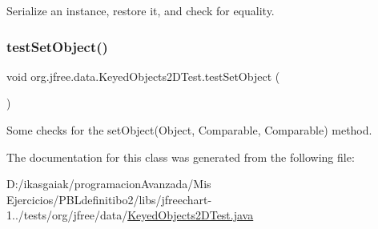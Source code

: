 Serialize an instance, restore it, and check for equality. \mbox{\label{classorg_1_1jfree_1_1data_1_1_keyed_objects2_d_test_abf42be762da76e5c3773c06e4d5bc339}} 
\subsubsection{\texorpdfstring{test\+Set\+Object()}{testSetObject()}}
{\footnotesize\ttfamily void org.\+jfree.\+data.\+Keyed\+Objects2\+D\+Test.\+test\+Set\+Object (\begin{DoxyParamCaption}{ }\end{DoxyParamCaption})}

Some checks for the set\+Object(\+Object, Comparable, Comparable) method. 

The documentation for this class was generated from the following file\+:\begin{DoxyCompactItemize}
\item 
D\+:/ikasgaiak/programacion\+Avanzada/\+Mis Ejercicios/\+P\+B\+Ldefinitibo2/libs/jfreechart-\/1../tests/org/jfree/data/\mbox{\hyperlink{_keyed_objects2_d_test_8java}{Keyed\+Objects2\+D\+Test.\+java}}\end{DoxyCompactItemize}
